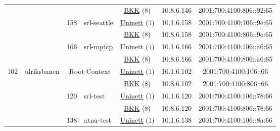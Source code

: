 \begin{small}
\begin{center}
\begin{longtable}{|c|c|c|c|c|c|c|c|}
  &  &  &  & \multicolumn{2}{|c|}{\tiny{\href{http://bkk.no}{BKK} (8)}} & \tiny{10.8.6.146} & \tiny{2001:700:4100:806::92:65} \\* \cline{3-3}\cline{4-4}\cline{5-5}\cline{6-6}\cline{7-7}\cline{8-8}
  &  & \multirow{2}{*}{\tiny{158}} & \multicolumn{1}{|l|}{\multirow{2}{*}{\tiny{srl-seattle}}} & \multicolumn{2}{|c|}{\tiny{\href{https://www.uninett.no}{Uninett} (1)}} & \tiny{10.1.6.158} & \tiny{2001:700:4100:106::9e:65} \\* \cline{5-5}\cline{6-6}\cline{7-7}\cline{8-8}
  &  &  &  & \multicolumn{2}{|c|}{\tiny{\href{http://bkk.no}{BKK} (8)}} & \tiny{10.8.6.158} & \tiny{2001:700:4100:806::9e:65} \\* \cline{3-3}\cline{4-4}\cline{5-5}\cline{6-6}\cline{7-7}\cline{8-8}
  &  & \multirow{2}{*}{\tiny{166}} & \multicolumn{1}{|l|}{\multirow{2}{*}{\tiny{srl-mptcp}}} & \multicolumn{2}{|c|}{\tiny{\href{https://www.uninett.no}{Uninett} (1)}} & \tiny{10.1.6.166} & \tiny{2001:700:4100:106::a6:65} \\* \cline{5-5}\cline{6-6}\cline{7-7}\cline{8-8}
  &  &  &  & \multicolumn{2}{|c|}{\tiny{\href{http://bkk.no}{BKK} (8)}} & \tiny{10.8.6.166} & \tiny{2001:700:4100:806::a6:65} \\ \hline
 \multirow{14}{*}{\tiny{102}} & \multicolumn{1}{|l|}{\multirow{14}{*}{\tiny{ulriksbanen}}} & \multicolumn{2}{|c|}{\multirow{2}{*}{\tiny{Root Context}}} & \multicolumn{2}{|c|}{\tiny{\href{https://www.uninett.no}{Uninett} (1)}} & \tiny{10.1.6.102} & \tiny{2001:700:4100:106::66} \\* \cline{5-5}\cline{6-6}\cline{7-7}\cline{8-8}
  &  & \multicolumn{2}{|c|}{} & \multicolumn{2}{|c|}{\tiny{\href{http://bkk.no}{BKK} (8)}} & \tiny{10.8.6.102} & \tiny{2001:700:4100:806::66} \\* \cline{3-3}\cline{4-4}\cline{5-5}\cline{6-6}\cline{7-7}\cline{8-8}
  &  & \multirow{2}{*}{\tiny{120}} & \multicolumn{1}{|l|}{\multirow{2}{*}{\tiny{srl-test}}} & \multicolumn{2}{|c|}{\tiny{\href{https://www.uninett.no}{Uninett} (1)}} & \tiny{10.1.6.120} & \tiny{2001:700:4100:106::78:66} \\* \cline{5-5}\cline{6-6}\cline{7-7}\cline{8-8}
  &  &  &  & \multicolumn{2}{|c|}{\tiny{\href{http://bkk.no}{BKK} (8)}} & \tiny{10.8.6.120} & \tiny{2001:700:4100:806::78:66} \\* \cline{3-3}\cline{4-4}\cline{5-5}\cline{6-6}\cline{7-7}\cline{8-8}
  &  & \multirow{2}{*}{\tiny{138}} & \multicolumn{1}{|l|}{\multirow{2}{*}{\tiny{ntnu-test}}} & \multicolumn{2}{|c|}{\tiny{\href{https://www.uninett.no}{Uninett} (1)}} & \tiny{10.1.6.138} & \tiny{2001:700:4100:106::8a:66} \\* \cline{5-5}\cline{6-6}\cline{7-7}\cline{8-8}

\end{longtable}
\end{center}
\end{small}
